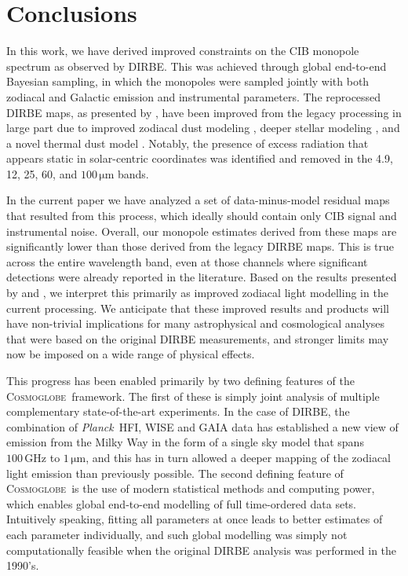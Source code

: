 \documentclass{aa}
\def\Planck{\textit{Planck}}
\newcommand{\cosmoglobe}{\textsc{Cosmoglobe}}
\begin{document}
\section{Conclusions}
\label{sec:conclusions}

In this work, we have derived improved constraints on the CIB monopole spectrum as observed by DIRBE. This was achieved through global end-to-end Bayesian sampling, in which the monopoles were sampled jointly with both zodiacal and Galactic emission and instrumental parameters. The reprocessed DIRBE maps, as presented by \citet{CG02_01}, have been improved from the legacy processing in large part due to improved zodiacal dust modeling \citep{CG02_02}, deeper stellar modeling \citep{CG02_04}, and a novel thermal dust model \citep{CG02_05}. Notably, the presence of excess radiation that appears static in solar-centric coordinates was identified and removed in the 4.9, 12, 25, 60, and $100\,\mathrm{\mu m}$ bands.


In the current paper we have analyzed a set of data-minus-model residual maps that resulted from this process, which ideally should contain only CIB signal and instrumental noise. Overall, our monopole estimates derived from these maps are significantly lower than those derived from the legacy DIRBE maps. This is true across the entire wavelength band, even at those channels where significant detections were already reported in the literature. Based on the results presented by \citet{CG02_01} and \citet{CG02_02}, we interpret this primarily as improved zodiacal light modelling in the current processing. We anticipate that these improved results and products will have non-trivial implications for many astrophysical and cosmological analyses that were based on the original DIRBE measurements, and stronger limits may now be imposed on a wide range of physical effects.

This progress has been enabled primarily by two defining features of the \cosmoglobe\ framework. The first of these is simply joint analysis of multiple complementary state-of-the-art experiments. In the case of DIRBE, the combination of \Planck\ HFI, WISE and GAIA data has established a new view of emission from the Milky Way in the form of a single sky model that spans $100\,\mathrm{GHz}$ to $1\,\mathrm{\mu m}$, and this has in turn allowed a deeper mapping of the zodiacal light emission than previously possible. The second defining feature of \cosmoglobe\ is the use of modern statistical methods and computing power, which enables global end-to-end modelling of full time-ordered data sets. Intuitively speaking, fitting all parameters at once leads to better estimates of each parameter individually, and such global modelling was simply not computationally feasible when the original DIRBE analysis was performed in the 1990's.
\end{document}

